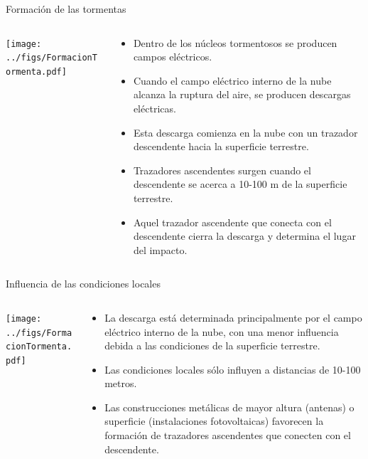 \documentclass[aspectratio=169, usenames,svgnames,dvipsnames]{beamer}
\begin{document}
\begin{frame}[label={sec:orgb46a065}]{Formación de las tormentas}
\begin{columns}
\begin{column}{0.5\columnwidth}
\begin{center}
\texttt{[image: ../figs/FormacionTormenta.pdf]}
\end{center}
\end{column}

\begin{column}{0.5\columnwidth}
\begin{itemize}
\item Dentro de los núcleos tormentosos se producen campos eléctricos.

\item Cuando el campo eléctrico interno de la nube alcanza la ruptura del
aire, se producen descargas eléctricas.

\item \alert{Esta descarga comienza en la nube} con un \alert{trazador descendente} hacia
la superficie terrestre.

\item Trazadores ascendentes surgen cuando el descendente se acerca a
10-100 m de la superficie terrestre.

\item Aquel trazador ascendente que conecta con el descendente cierra la
descarga y determina el lugar del impacto.
\end{itemize}
\end{column}
\end{columns}
\end{frame}

\begin{frame}[label={sec:orgfba9c82}]{Influencia de las condiciones locales}
\begin{columns}
\begin{column}{0.5\columnwidth}
\begin{center}
\texttt{[image: ../figs/FormacionTormenta.pdf]}
\end{center}
\end{column}

\begin{column}{0.5\columnwidth}
\begin{itemize}
\item \alert{La descarga está determinada principalmente por el campo eléctrico
interno de la nube}, con una menor influencia debida a las
condiciones de la superficie terrestre.

\item Las \alert{condiciones locales sólo influyen} a distancias de 10-100 metros.

\item Las \alert{construcciones metálicas de mayor altura} (antenas) o superficie
(instalaciones fotovoltaicas) favorecen la formación de trazadores
ascendentes que conecten con el descendente.
\end{itemize}
\end{column}
\end{columns}
\end{frame}
\end{document}
